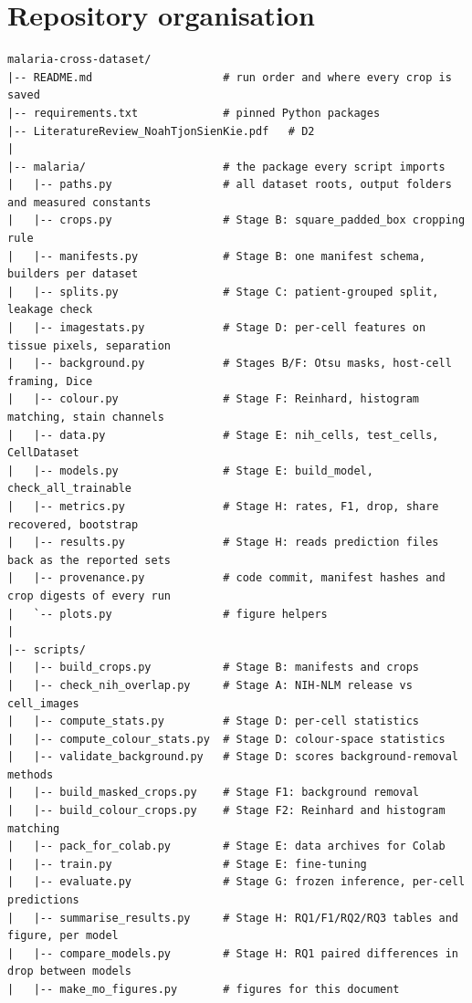 \documentclass[11pt,a4paper]{article}
\begin{document}
\clearpage
\section{Repository organisation}

\begin{Verbatim}[fontsize=\fontsize{6.5}{8}\selectfont,frame=none]
malaria-cross-dataset/
|-- README.md                    # run order and where every crop is saved
|-- requirements.txt             # pinned Python packages
|-- LiteratureReview_NoahTjonSienKie.pdf   # D2
|
|-- malaria/                     # the package every script imports
|   |-- paths.py                 # all dataset roots, output folders and measured constants
|   |-- crops.py                 # Stage B: square_padded_box cropping rule
|   |-- manifests.py             # Stage B: one manifest schema, builders per dataset
|   |-- splits.py                # Stage C: patient-grouped split, leakage check
|   |-- imagestats.py            # Stage D: per-cell features on tissue pixels, separation
|   |-- background.py            # Stages B/F: Otsu masks, host-cell framing, Dice
|   |-- colour.py                # Stage F: Reinhard, histogram matching, stain channels
|   |-- data.py                  # Stage E: nih_cells, test_cells, CellDataset
|   |-- models.py                # Stage E: build_model, check_all_trainable
|   |-- metrics.py               # Stage H: rates, F1, drop, share recovered, bootstrap
|   |-- results.py               # Stage H: reads prediction files back as the reported sets
|   |-- provenance.py            # code commit, manifest hashes and crop digests of every run
|   `-- plots.py                 # figure helpers
|
|-- scripts/
|   |-- build_crops.py           # Stage B: manifests and crops
|   |-- check_nih_overlap.py     # Stage A: NIH-NLM release vs cell_images
|   |-- compute_stats.py         # Stage D: per-cell statistics
|   |-- compute_colour_stats.py  # Stage D: colour-space statistics
|   |-- validate_background.py   # Stage D: scores background-removal methods
|   |-- build_masked_crops.py    # Stage F1: background removal
|   |-- build_colour_crops.py    # Stage F2: Reinhard and histogram matching
|   |-- pack_for_colab.py        # Stage E: data archives for Colab
|   |-- train.py                 # Stage E: fine-tuning
|   |-- evaluate.py              # Stage G: frozen inference, per-cell predictions
|   |-- summarise_results.py     # Stage H: RQ1/F1/RQ2/RQ3 tables and figure, per model
|   |-- compare_models.py        # Stage H: RQ1 paired differences in drop between models
|   |-- make_mo_figures.py       # figures for this document

\end{Verbatim}
\end{document}
